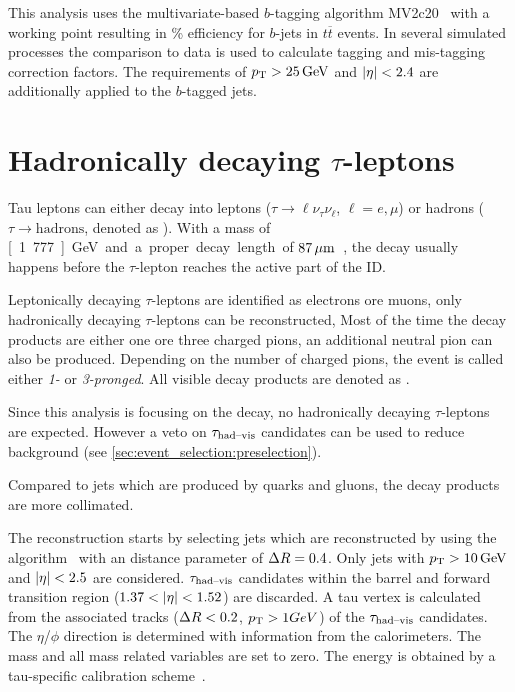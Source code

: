 This analysis uses the multivariate-based $b$-tagging algorithm MV2c20~\cite{PERF-2012-04,ATL-PHYS-PUB-2016-012} with
a working point resulting in \unit[85]{\%} efficiency for $b$-jets in $t\overline{t}$ events. In several simulated processes
the comparison to data is used to calculate tagging and mis-tagging correction factors.
The requirements of $\pt > \unit[25]{GeV}$ and $\left|\eta\right| < 2.4$ are additionally applied to the $b$-tagged jets.


\section{Hadronically decaying  $\tau$-leptons}\label{sec:object_selection:tau_leptons}

Tau leptons can either decay into leptons ($\tau \to \ell \nu_\tau \nu_\ell$, $\ell = e, \mu$) or hadrons
($\tau \to \text{hadrons}$, denoted as \tauhad{}).
With a mass of \unit[1.777]{GeV} and a proper decay length of $\unit[87]{\mu m}$~\cite{PDG}, the decay usually happens before
the $\tau$-lepton reaches the active part of the ID\@. %

Leptonically decaying $\tau$-leptons are identified as electrons ore muons, only hadronically decaying $\tau$-leptons can be reconstructed,
Most of the time the decay products are either one ore three charged pions, an additional neutral pion can also be produced.
Depending on the number of charged pions, the event is called either \emph{1-} or \emph{3-pronged}.
All visible decay products are denoted as \tauhadvis{}.

Since this analysis is focusing on the \Httllfull{} decay, no hadronically decaying $\tau$-leptons are expected.
However a veto on $\tau_\text{had--vis}$ candidates can be used to reduce background (see \cref{sec:event_selection:preselection}).

Compared to jets which are produced by quarks and gluons, the \tauhad{} decay products are more collimated.

The reconstruction starts by selecting jets which are reconstructed by using the \antikt{} algorithm~\cite{Cacciari:2008gp,Cacciari:2005hq}
with an distance parameter of $\Delta R = 0.4$.
Only jets with $\pt > \unit[10]{GeV}$ and $\left|\eta\right| < 2.5$ are considered.
$\tau_\text{had--vis}$ candidates within the barrel and  forward transition region ($1.37 < \left|\eta\right| < 1.52$) are discarded.
A tau vertex is calculated from the associated tracks ($\Delta R < 0.2$, $p_\text{T} > 1 GeV$) of the $\tau_\text{had--vis}$ candidates.
The $\eta$/$\phi$ direction is determined with information from the calorimeters. %
The mass and all mass related variables are set to zero.
The energy is  obtained by a tau-specific calibration scheme~\cite{Run1TauPaper}.

